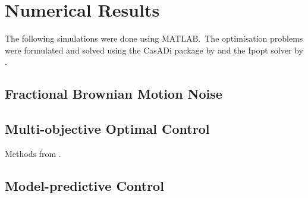 \section{Numerical Results}

The following simulations were done using MATLAB.\ 
The optimisation problems were formulated and solved using the CasADi package by \cite{Andersson2019casadi} and the Ipopt solver by \cite{Waechter2006ipopt}.\ 


\subsection{Fractional Brownian Motion Noise}

\subsection{Multi-objective Optimal Control}
Methods from \cite{Hoffmann2022moocp_wcdeg}.

\subsection{Model-predictive Control}